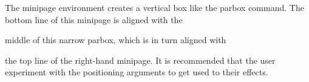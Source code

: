 \documentclass{article}
\begin{document}
\begin{minipage}[b]{4.3cm}
The minipage environment creates a vertical box like the
parbox command. The bottom line of this minipage is aligned with the
\end{minipage} \hfill
\parbox{3.0cm}{middle of this narrow parbox, which is in turn
aligned with}
\hfill
\begin{minipage}[t]{3.8cm}
the top line of the right-hand minipage. It is recommended
that the user experiment with the positioning arguments to get
used to their effects.
\end{minipage}
\end{document}
